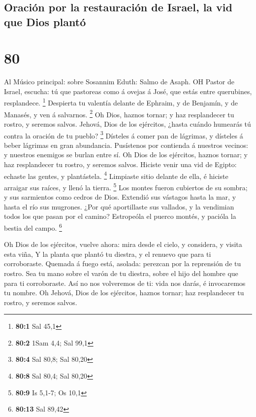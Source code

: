 \hypertarget{oraciuxf3n-por-la-restauraciuxf3n-de-israel-la-vid-que-dios-plantuxf3}{%
\subsection{Oración por la restauración de Israel, la vid que Dios
plantó}\label{oraciuxf3n-por-la-restauraciuxf3n-de-israel-la-vid-que-dios-plantuxf3}}

\hypertarget{section-79}{%
\section{80}\label{section-79}}

 Al Músico principal: sobre Sosannim Eduth: Salmo de Asaph.
OH Pastor de Israel, escucha: tú que pastoreas como á ovejas á José, que
estás entre querubines, resplandece. \footnote{\textbf{80:1} Sal 45,1}
 Despierta tu valentía delante de Ephraim, y de Benjamín, y
de Manasés, y ven á salvarnos. \footnote{\textbf{80:2} 1Sam 4,4; Sal
  99,1}  Oh Dios, haznos tornar; y haz resplandecer tu
rostro, y seremos salvos.  Jehová, Dios de los ejércitos,
¿hasta cuándo humearás tú contra la oración de tu pueblo? \footnote{\textbf{80:4}
  Sal 80,8; Sal 80,20}  Dísteles á comer pan de lágrimas, y
dísteles á beber lágrimas en gran abundancia.  Pusístenos
por contienda á nuestros vecinos: y nuestros enemigos se burlan entre
sí.  Oh Dios de los ejércitos, haznos tornar; y haz
resplandecer tu rostro, y seremos salvos.  Hiciste venir una
vid de Egipto: echaste las gentes, y plantástela. \footnote{\textbf{80:8}
  Sal 80,4; Sal 80,20}  Limpiaste sitio delante de ella, é
hiciste arraigar sus raíces, y llenó la tierra. \footnote{\textbf{80:9}
  Is 5,1-7; Os 10,1}  Los montes fueron cubiertos de su
sombra; y sus sarmientos como cedros de Dios.  Extendió sus
vástagos hasta la mar, y hasta el río sus mugrones.  ¿Por
qué aportillaste sus vallados, y la vendimian todos los que pasan por el
camino?  Estropeóla el puerco montés, y pacióla la bestia
del campo. \footnote{\textbf{80:13} Sal 89,42}

 Oh Dios de los ejércitos, vuelve ahora: mira desde el
cielo, y considera, y visita esta viña,  Y la planta que
plantó tu diestra, y el renuevo que para ti corroboraste. 
Quemada á fuego está, asolada: perezcan por la reprensión de tu rostro.
 Sea tu mano sobre el varón de tu diestra, sobre el hijo
del hombre que para ti corroboraste.  Así no nos volveremos
de ti: vida nos darás, é invocaremos tu nombre.  Oh Jehová,
Dios de los ejércitos, haznos tornar; haz resplandecer tu rostro, y
seremos salvos.

